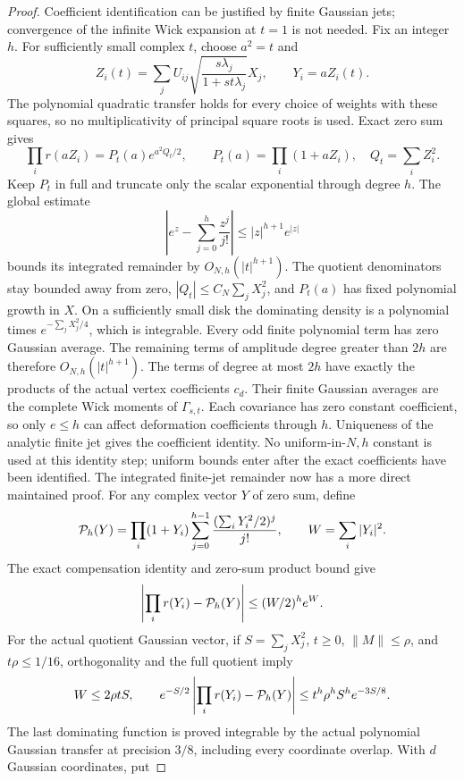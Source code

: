 \begin{proof}
Coefficient identification can be justified by finite Gaussian jets;
convergence of the infinite Wick expansion at \(t=1\) is not needed.
Fix an integer \(h\). For sufficiently small complex \(t\), choose
\(a^2=t\) and
\[
 Z_i(t)=\sum_jU_{ij}\sqrt{\frac{s\lambda_j}{1+st\lambda_j}}X_j,
 \qquad Y_i=aZ_i(t).
\]
The polynomial quadratic transfer holds for every choice of weights
with these squares, so no multiplicativity of principal square roots
is used. Exact zero sum gives
\[
 \prod_i r(aZ_i)=P_t(a)e^{a^2Q_t/2},\qquad
 P_t(a)=\prod_i(1+aZ_i),\quad Q_t=\sum_i Z_i^2.
\]
Keep \(P_t\) in full and truncate only the scalar exponential through
degree \(h\). The global estimate
\[
 \left|e^z-\sum_{j=0}^{h}\frac{z^j}{j!}\right|
                              \leq |z|^{h+1}e^{|z|}
\]
bounds its integrated remainder by \(O_{N,h}(|t|^{h+1})\).
The quotient denominators stay bounded away from zero,
\(|Q_t|\leq C_N\sum_jX_j^2\), and \(P_t(a)\) has fixed polynomial
growth in \(X\). On a sufficiently small disk the dominating density
is a polynomial times \(e^{-\sum_jX_j^2/4}\), which is integrable.
Every odd finite polynomial term has zero Gaussian average.
The remaining terms of amplitude degree greater than \(2h\) are
therefore \(O_{N,h}(|t|^{h+1})\).
The terms of degree at most \(2h\) have exactly the products of the
actual vertex coefficients \(c_d\). Their finite Gaussian averages
are the complete Wick moments of \(\Gamma_{s,t}\).
Each covariance has zero constant coefficient, so only \(e\leq h\)
can affect deformation coefficients through \(h\).
Uniqueness of the analytic finite jet gives the coefficient identity.
No uniform-in-\(N,h\) constant is used at this identity step; uniform
bounds enter after the exact coefficients have been identified.
The integrated finite-jet remainder now has a more direct maintained proof.
For any complex vector \(Y\) of zero sum, define
\[
 {\cal P}_h(Y)=\prod_i(1+Y_i)
       \sum_{j=0}^{h-1}\frac{(\sum_iY_i^2/2)^j}{j!},
 \qquad W=\sum_i|Y_i|^2 .
\]
The exact compensation identity and zero-sum product bound give
\[
 \left|\prod_i r(Y_i)-{\cal P}_h(Y)\right|
                         \leq(W/2)^h e^W .
\]
For the actual quotient Gaussian vector, if
\(S=\sum_jX_j^2\), \(t\geq0\), \(\|M\|\leq\rho\), and
\(t\rho\leq1/16\), orthogonality and the full quotient imply
\[
 W\leq2\rho tS,\qquad
 e^{-S/2}\left|\prod_i r(Y_i)-{\cal P}_h(Y)\right|
                       \leq t^h\rho^h S^h e^{-3S/8}.
\]
The last dominating function is proved integrable by the actual
polynomial Gaussian transfer at precision \(3/8\), including every
coordinate overlap. With \(d\) Gaussian coordinates, put

\end{proof}
